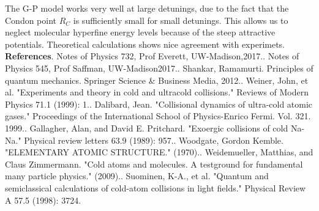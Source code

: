 \documentclass{article}
\begin{document}
The G-P model works very well at large detunings, due to the fact that the Condon point $R_C$ is sufficiently small for small detunings. This allows us to neglect molecular hyperfine energy levels because of the steep attractive potentials. Theoretical calculations shows nice agreement with experimets. \newline\newline\newline
\newline
\textbf{References}. Notes of Physics 732, Prof Everett, UW-Madison,2017.. Notes of Physics 545, Prof Saffman, UW-Madison2017.. Shankar, Ramamurti. Principles of quantum mechanics. Springer Science \& Business Media, 2012.. Weiner, John, et al. "Experiments and theory in cold and ultracold collisions." Reviews of Modern Physics 71.1 (1999): 1.. Dalibard, Jean. "Collisional dynamics of ultra-cold atomic gases." Proceedings of the International School of Physics-Enrico Fermi. Vol. 321. 1999.. Gallagher, Alan, and David E. Pritchard. "Exoergic collisions of cold Na-Na." Physical review letters 63.9 (1989): 957.. Woodgate, Gordon Kemble. "ELEMENTARY ATOMIC STRUCTURE." (1970).. Weidemueller, Matthias, and Claus Zimmermann. "Cold atoms and molecules. A testground for fundamental many particle physics." (2009).. Suominen, K-A., et al. "Quantum and semiclassical calculations of cold-atom collisions in light fields." Physical Review A 57.5 (1998): 3724.\newline
\end{document}
